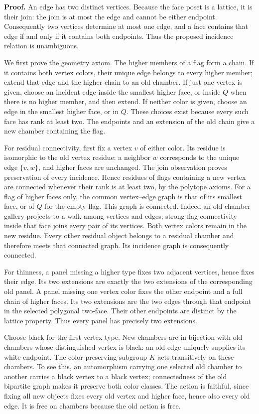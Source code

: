 \textbf{Proof.}
An edge has two distinct vertices. Because the face poset is a lattice, it is their join: the join is at most the edge and cannot be either endpoint. Consequently two vertices determine at most one edge, and a face contains that edge if and only if it contains both endpoints. Thus the proposed incidence relation is unambiguous.

We first prove the geometry axiom. The higher members of a flag form a chain. If it contains both vertex colors, their unique edge belongs to every higher member; extend that edge and the higher chain to an old chamber. If just one vertex is given, choose an incident edge inside the smallest higher face, or inside $Q$ when there is no higher member, and then extend. If neither color is given, choose an edge in the smallest higher face, or in $Q$. These choices exist because every such face has rank at least two. The endpoints and an extension of the old chain give a new chamber containing the flag.

For residual connectivity, first fix a vertex $v$ of either color. Its residue is isomorphic to the old vertex residue: a neighbor $w$ corresponds to the unique edge $\{v,w\}$, and higher faces are unchanged. The join observation proves preservation of every incidence. Hence residues of flags containing a new vertex are connected whenever their rank is at least two, by the polytope axioms. For a flag of higher faces only, the common vertex--edge graph is that of its smallest face, or of $Q$ for the empty flag. This graph is connected. Indeed an old chamber gallery projects to a walk among vertices and edges; strong flag connectivity inside that face joins every pair of its vertices. Both vertex colors remain in the new residue. Every other residual object belongs to a residual chamber and therefore meets that connected graph. Its incidence graph is consequently connected.

For thinness, a panel missing a higher type fixes two adjacent vertices, hence fixes their edge. Its two extensions are exactly the two extensions of the corresponding old panel. A panel missing one vertex color fixes the other endpoint and a full chain of higher faces. Its two extensions are the two edges through that endpoint in the selected polygonal two-face. Their other endpoints are distinct by the lattice property. Thus every panel has precisely two extensions.

Choose black for the first vertex type. New chambers are in bijection with old chambers whose distinguished vertex is black: an old edge uniquely supplies its white endpoint. The color-preserving subgroup $K$ acts transitively on these chambers. To see this, an automorphism carrying one selected old chamber to another carries a black vertex to a black vertex; connectedness of the old bipartite graph makes it preserve both color classes. The action is faithful, since fixing all new objects fixes every old vertex and higher face, hence also every old edge. It is free on chambers because the old action is free.

